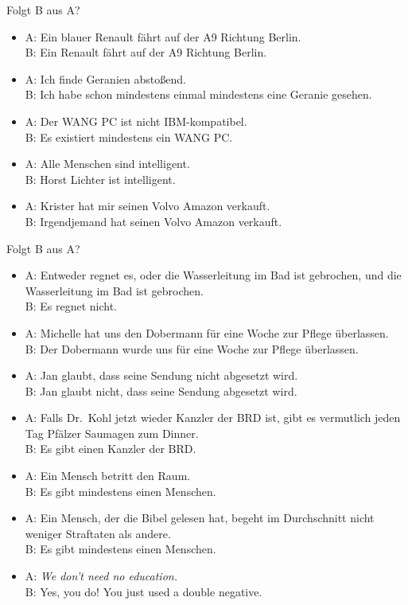 \begin{frame}
  {Folgt B aus A?} %
  \onslide<+->
  \begin{itemize}[<+->]
    \item A: Ein blauer Renault fährt auf der A9 Richtung Berlin.\\
      B: Ein Renault fährt auf der A9 Richtung Berlin.
    \item A: Ich finde Geranien abstoßend.\\
      B: Ich habe schon mindestens einmal mindestens eine Geranie gesehen.
    \item A: Der WANG PC ist nicht IBM-kompatibel.\\
      B: Es existiert mindestens ein WANG PC.
    \item A: Alle Menschen sind intelligent.\\
      B: Horst Lichter ist intelligent.
    \item A: Krister hat mir seinen Volvo Amazon verkauft.\\
      B: Irgendjemand hat seinen Volvo Amazon verkauft.
  \end{itemize}
\end{frame}

\begin{frame}
  {Folgt B aus A?} %
  \begin{itemize}[<+->]
    \item A: Entweder regnet es, oder die Wasserleitung im Bad ist gebrochen, und die Wasserleitung im Bad ist gebrochen.\\
      B: Es regnet nicht.
    \item A: Michelle hat uns den Dobermann für eine Woche zur Pflege überlassen.\\
      B: Der Dobermann wurde uns für eine Woche zur Pflege überlassen.
    \item A: Jan glaubt, dass seine Sendung nicht abgesetzt wird.\\
      B: Jan glaubt nicht, dass seine Sendung abgesetzt wird.
    \item A: Falls Dr.\ Kohl jetzt wieder Kanzler der BRD ist, gibt es vermutlich jeden Tag Pfälzer Saumagen zum Dinner.\\
      B: Es gibt einen Kanzler der BRD.
    \item A: Ein Mensch betritt den Raum.\\
      B: Es gibt mindestens einen Menschen.
    \item A: Ein Mensch, der die Bibel gelesen hat, begeht im Durchschnitt nicht weniger Straftaten als andere.\\
      B: Es gibt mindestens einen Menschen.
    \item A: \textit{We don't need no education.}\\
      B: Yes, you do! You just used a double negative.
  \end{itemize}
\end{frame}

